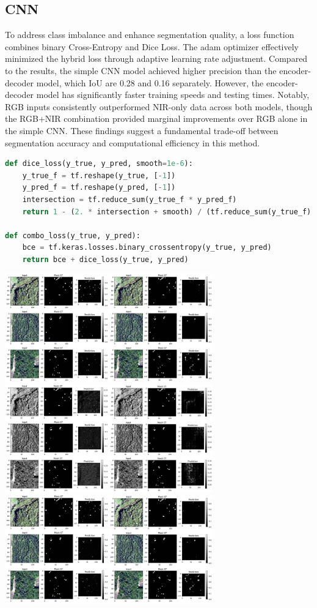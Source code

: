 \subsection{CNN}
To address class imbalance and enhance segmentation quality, a loss function combines binary Cross-Entropy and Dice Loss. The adam optimizer effectively minimized the hybrid loss through adaptive learning rate adjustment. Compared to the results, the simple CNN model achieved higher precision than the encoder-decoder model, which IoU are 0.28 and 0.16 separately. However, the encoder-decoder model has significantly faster training speeds and testing times. Notably, RGB inputs consistently outperformed NIR-only data across both models, though the RGB+NIR combination provided marginal improvements over RGB alone in the simple CNN. These findings suggest a fundamental trade-off between segmentation accuracy and computational efficiency in this method. 
\begin{lstlisting}[language=Python]
def dice_loss(y_true, y_pred, smooth=1e-6):
    y_true_f = tf.reshape(y_true, [-1])
    y_pred_f = tf.reshape(y_pred, [-1])
    intersection = tf.reduce_sum(y_true_f * y_pred_f)
    return 1 - (2. * intersection + smooth) / (tf.reduce_sum(y_true_f) + tf.reduce_sum(y_pred_f) + smooth)

def combo_loss(y_true, y_pred):
    bce = tf.keras.losses.binary_crossentropy(y_true, y_pred)
    return bce + dice_loss(y_true, y_pred)
\end{lstlisting}
\includegraphics[width = 9cm]{figs/CNN_mask.jpg}\\
\includegraphics[width = 9cm]{figs/CNN_mask2.jpg}\\
\includegraphics[width = 9cm]{figs/CNN_mask3.jpg}\\

